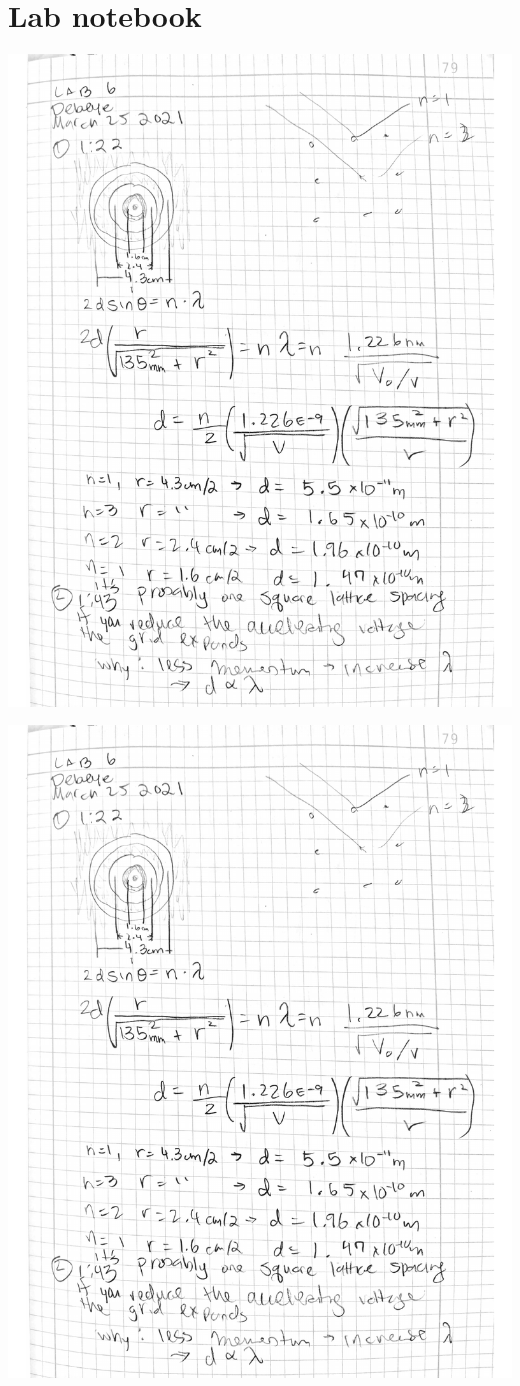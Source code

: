 \documentclass[notitlepage]{report}
\begin{document}
	\section*{Lab notebook}
\begin{center}
	\includegraphics[width=\linewidth,page=1,clip]{Scanned_20210406-1310}
\end{center}
\begin{center}
		\includegraphics[width=\linewidth,page=2,clip]{Scanned_20210406-1310}
\end{center}
\end{document}
